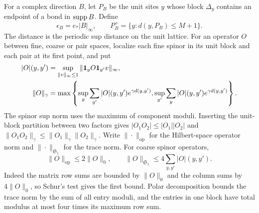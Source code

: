 For a complex direction $B$, let $P_B$ be the unit sites
$y$ whose block $\Delta_y$ contains an endpoint of a bond
in $\operatorname{supp} B$. Define
\[
 \epsilon_B=e_*|B|_\infty,\qquad
 P_B^+=\{y:d(y,P_B)\le M+1\}.
\]
The distance is the periodic sup distance on the unit
lattice. For an operator $O$ between fine, coarse or
pair spaces, localize each fine spinor in its unit
block and each pair at its first point, and put
\begin{align}
 |O|(y,y')&=\sup_{\|v\|_\infty\le1}
                         \|\mathbf1_yO\mathbf1_{y'}v\|_\infty,\notag\\
 \|O\|_\gamma&=\max\left\{
       \sup_y\sum_{y'}|O|(y,y')e^{\gamma d(y,y')},
       \sup_{y'}\sum_y|O|(y,y')e^{\gamma d(y,y')}\right\}.
                                  \label{eq:interacting-operator-majorants}
\end{align}
The spinor sup norm uses the maximum of component
moduli. Inserting the unit-block partition between
two factors gives
$|O_1O_2|\le|O_1||O_2|$ and
$\|O_1O_2\|_\gamma\le\|O_1\|_\gamma\|O_2\|_\gamma$.
Write $\|\cdot\|_{\mathrm{op}}$ for the Hilbert-space operator norm
and $\|\cdot\|_{\mathfrak S_1}$ for the trace norm. For coarse
spinor operators,
\begin{equation}\label{eq:interacting-matrix-norms}
 \|O\|_{\mathrm{op}}\le2\|O\|_0,\qquad
 \|O\|_{\mathfrak S_1}\le4\sum_{y,y'}|O|(y,y').
\end{equation}
Indeed the matrix row sums are bounded by $\|O\|_0$
and the column sums by $4\|O\|_0$, so Schur's test
gives the first bound. Polar decomposition bounds
the trace norm by the sum of all entry moduli, and
the entries in one block have total modulus at most
four times its maximum row sum.

